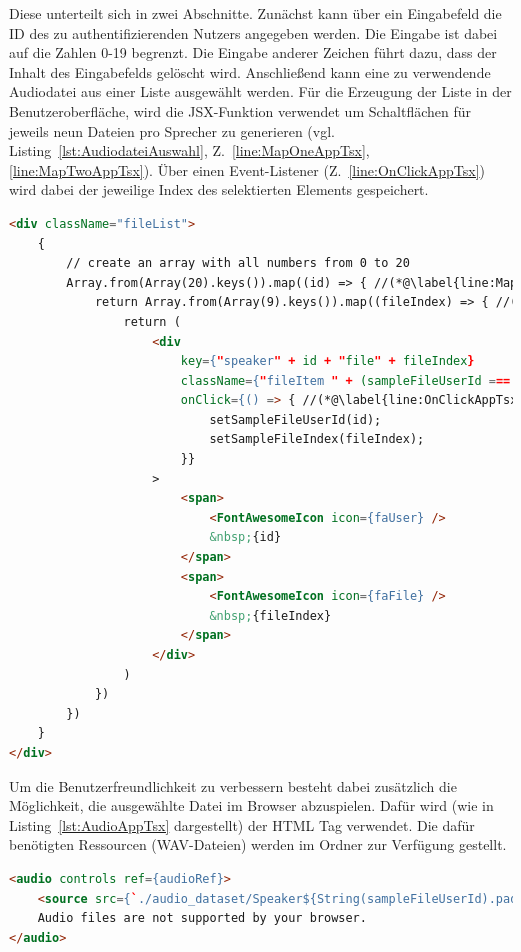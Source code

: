Diese unterteilt sich in zwei Abschnitte.
Zunächst kann über ein Eingabefeld die ID des zu authentifizierenden Nutzers angegeben werden.
Die Eingabe ist dabei auf die Zahlen 0-19 begrenzt.
Die Eingabe anderer Zeichen führt dazu, dass der Inhalt des Eingabefelds gelöscht wird.
Anschließend kann eine zu verwendende Audiodatei aus einer Liste ausgewählt werden.
Für die Erzeugung der Liste in der Benutzeroberfläche, wird die JSX-Funktion  verwendet um Schaltflächen für jeweils neun Dateien pro Sprecher zu generieren (vgl. Listing~\ref{lst:AudiodateiAuswahl}, Z.~\ref{line:MapOneAppTsx},\ref{line:MapTwoAppTsx}).
Über einen  Event-Listener (Z.~\ref{line:OnClickAppTsx}) wird dabei der jeweilige Index des selektierten Elements gespeichert.
\begin{lstlisting}[language=HTML,caption=Auswahl der Audiodatei - App.tsx,label=lst:AudiodateiAuswahl]
<div className="fileList">
    {
        // create an array with all numbers from 0 to 20
        Array.from(Array(20).keys()).map((id) => { //(*@\label{line:MapOneAppTsx}@*)
            return Array.from(Array(9).keys()).map((fileIndex) => { //(*@\label{line:MapTwoAppTsx}@*)
                return (
                    <div 
                        key={"speaker" + id + "file" + fileIndex}
                        className={"fileItem " + (sampleFileUserId === id && sampleFileIndex === fileIndex ? "selected" : "")}
                        onClick={() => { //(*@\label{line:OnClickAppTsx}@*)
                            setSampleFileUserId(id);
                            setSampleFileIndex(fileIndex);
                        }}
                    >
                        <span>
                            <FontAwesomeIcon icon={faUser} />
                            &nbsp;{id}
                        </span>
                        <span>
                            <FontAwesomeIcon icon={faFile} />
                            &nbsp;{fileIndex}
                        </span>
                    </div>
                )
            })
        })
    }
</div>
\end{lstlisting}

Um die Benutzerfreundlichkeit zu verbessern besteht dabei zusätzlich die Möglichkeit, die ausgewählte Datei im Browser abzuspielen.
Dafür wird (wie in Listing~\ref{lst:AudioAppTsx} dargestellt) der \ac{HTML}  Tag verwendet.
Die dafür benötigten Ressourcen (WAV-Dateien) werden im Ordner  zur Verfügung gestellt.
\begin{lstlisting}[language=HTML,caption=Audio Tag - App.tsx,label=lst:AudioAppTsx]
<audio controls ref={audioRef}>
    <source src={`./audio_dataset/Speaker${String(sampleFileUserId).padStart(4, '0')}/Validation_Speaker${String(sampleFileUserId).padStart(2, '0')}_${String(sampleFileIndex).padStart(4, '0')}.wav`} type="audio/wav" />
    Audio files are not supported by your browser.
</audio>
\end{lstlisting}

